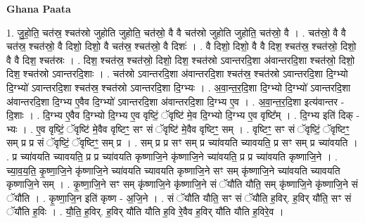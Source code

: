 \documentclass[17pt]{extarticle}
\begin{document}
\textbf{Ghana Paata } \newline

1. जु॒हो॒ति॒ चत॑स्र॒ श्चत॑स्रो जुहोति जुहोति॒ चत॑स्रो॒ वै वै चत॑स्रो जुहोति जुहोति॒ चत॑स्रो॒ वै । . चत॑स्रो॒ वै वै चत॑स्र॒ श्चत॑स्रो॒ वै दिशो॒ दिशो॒ वै चत॑स्र॒ श्चत॑स्रो॒ वै दिशः॑ । . वै दिशो॒ दिशो॒ वै वै दिश॒ श्चत॑स्र॒ श्चत॑स्रो॒ दिशो॒ वै वै दिश॒ श्चत॑स्रः । . दिश॒ श्चत॑स्र॒ श्चत॑स्रो॒ दिशो॒ दिश॒ श्चत॑स्रो ऽवान्तरदि॒शा अ॑वान्तरदि॒शा श्चत॑स्रो॒ दिशो॒ दिश॒ श्चत॑स्रो ऽवान्तरदि॒शाः । . चत॑स्रो ऽवान्तरदि॒शा अ॑वान्तरदि॒शा श्चत॑स्र॒ श्चत॑स्रो ऽवान्तरदि॒शा दि॒ग्भ्यो दि॒ग्भ्यो॑ ऽवान्तरदि॒शा श्चत॑स्र॒ श्चत॑स्रो ऽवान्तरदि॒शा दि॒ग्भ्यः । . अ॒वा॒न्त॒र॒दि॒शा दि॒ग्भ्यो दि॒ग्भ्यो॑ ऽवान्तरदि॒शा अ॑वान्तरदि॒शा दि॒ग्भ्य ए॒वैव दि॒ग्भ्यो॑ ऽवान्तरदि॒शा अ॑वान्तरदि॒शा दि॒ग्भ्य ए॒व । . अ॒वा॒न्त॒र॒दि॒शा इत्य॑वान्तर - दि॒शाः । . दि॒ग्भ्य ए॒वैव दि॒ग्भ्यो दि॒ग्भ्य ए॒व वृष्टिं॒ ॅवृष्टि॑ मे॒व दि॒ग्भ्यो दि॒ग्भ्य ए॒व वृष्टि᳚म् । . दि॒ग्भ्य इति॑ दिक् - भ्यः । . ए॒व वृष्टिं॒ ॅवृष्टि॑ मे॒वैव वृष्टिꣳ॒॒ सꣳ सं ॅवृष्टि॑ मे॒वैव वृष्टिꣳ॒॒ सम् । . वृष्टिꣳ॒॒ सꣳ सं ॅवृष्टिं॒ ॅवृष्टिꣳ॒॒ सम् प्र प्र सं ॅवृष्टिं॒ ॅवृष्टिꣳ॒॒ सम् प्र । . सम् प्र प्र सꣳ सम् प्र च्या॑वयति च्यावयति॒ प्र सꣳ सम् प्र च्या॑वयति । . प्र च्या॑वयति च्यावयति॒ प्र प्र च्या॑वयति कृष्णाजि॒ने कृ॑ष्णाजि॒ने च्या॑वयति॒ प्र प्र च्या॑वयति कृष्णाजि॒ने । . च्या॒व॒य॒ति॒ कृ॒ष्णा॒जि॒ने कृ॑ष्णाजि॒ने च्या॑वयति च्यावयति कृष्णाजि॒ने सꣳ सम् कृ॑ष्णाजि॒ने च्या॑वयति च्यावयति कृष्णाजि॒ने सम् । . कृ॒ष्णा॒जि॒ने सꣳ सम् कृ॑ष्णाजि॒ने कृ॑ष्णाजि॒ने सं ॅयौ॑ति यौति॒ सम् कृ॑ष्णाजि॒ने कृ॑ष्णाजि॒ने सं ॅयौ॑ति । . कृ॒ष्णा॒जि॒न इति॑ कृष्ण - अ॒जि॒ने । . सं ॅयौ॑ति यौति॒ सꣳ सं ॅयौ॑ति ह॒विर्. ह॒विर् यौ॑ति॒ सꣳ सं ॅयौ॑ति ह॒विः । . यौ॒ति॒ ह॒विर्. ह॒विर् यौ॑ति यौति ह॒वि रे॒वैव ह॒विर् यौ॑ति यौति ह॒विरे॒व । \newline
\end{document}
